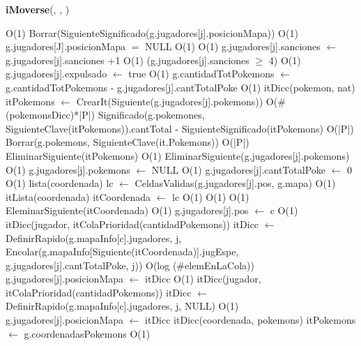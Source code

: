 \begin{Algoritmos}
\begin{algorithm}[H]{\textbf{iMoverse}(, , )}
	\begin{algorithmic}[1]
		 \Comment O(1)
				\State Borrar(SiguienteSignificado(g.jugadores[j].posicionMapa)) \Comment O(1)
				\State g.jugadores[J].posicionMapa $=$ NULL \Comment O(1)
		\EndIf		
		 \Comment O(1)
			\State g.jugadores[j].sanciones $\gets$ g.jugadores[j].sanciones +1 \Comment O(1)
			\If(g.jugadores[j].sanciones $\geq$ 4) \Comment O(1)
				\State g.jugadores[j].expulsado $\gets$ true \Comment O(1)			
			\EndIf
		\EndIf
			\State g.cantidadTotPokemons $\gets$ g.cantidadTotPokemons - g.jugadores[j].cantTotalPoke \Comment O(1)
			\State itDicc(pokemon, nat) itPokemons $\gets$ CrearIt(Siguiente(g.jugadores[j].pokemons))
			 \Comment O($\#$(pokemonsDicc)*|P|)
				\State Significado(g.pokemones, SiguienteClave(itPokemons)).cantTotal - SiguienteSignificado(itPokemons) \Comment O(|P|)
					\State Borrar(g.pokemons, SiguienteClave(it.Pokemons)) \Comment O(|P|)					\EndIf				
				\State EliminarSiguiente(itPokemons) \Comment O(1)		
			\EndWhile
			\State EliminarSiguiente(g.jugadores[j].pokemons) \Comment O(1)
			\State g.jugadores[j].pokemons $\gets$ NULL \Comment O(1)
			\State g.jugadores[j].cantTotalPoke $\gets$ 0 \Comment O(1)
		\Else
			\State lista(coordenada) lc $\gets$ CeldasValidas(g.jugadores[j].pos, g.mapa) \Comment O(1)
			\State itLista(coordenada) itCoordenada $\gets$ lc \Comment O(1)
			 \Comment O(1)
				 \Comment O(1)
					\State EleminarSiguiente(itCoordenada) \Comment O(1)
				\EndIf
			\EndWhile
			\State g.jugadores[j].pos $\gets$ c \Comment O(1)
				\State itDicc(jugador, itColaPrioridad(cantidadPokemons)) itDicc $\gets$ DefinirRapido(g.mapaInfo[c].jugadores, j, Encolar(g.mapaInfo[Siguiente(itCoordenada)].jugEspe, g.jugadores[j].cantTotalPoke, j)) \Comment O(log ($\#$elemEnLaCola))
				\State g.jugadores[j].posicionMapa $\gets$ itDicc \Comment O(1)
			\Else
				\State itDicc(jugador, itColaPrioridad(cantidadPokemons)) itDicc $\gets$ DefinirRapido(g.mapaInfo[c].jugadores, j, NULL)	\Comment O(1)		
				\State g.jugadores[j].posicionMapa $\gets$ itDicc
			\EndIf
		\EndIf
		\State itDicc(coordenada, pokemons) itPokemons $\gets$ g.coordenadasPokemons \Comment O(1)
		

\end{algorithmic}
\end{algorithm}
\end{Algoritmos}
